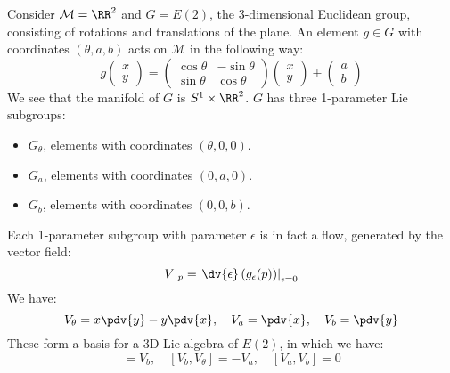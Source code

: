 \documentclass{jknotes}
\begin{document}
\begin{eg}
    Consider \(\mathcal{M}=\RR^2\) and \(G=E(2)\), the 3-dimensional Euclidean group, consisting of rotations and translations of the plane. An element \(g \in G\) with coordinates \((\theta,a,b)\) acts on \(\mathcal{M}\) in the following way:
    \begin{equation}
        g
        \begin{pmatrix}
            x \\ y
        \end{pmatrix}
        = 
        \begin{pmatrix}
            \cos\theta & -\sin\theta \\
            \sin\theta & \cos\theta
        \end{pmatrix}
        \begin{pmatrix}
            x \\ y
        \end{pmatrix}
        +
        \begin{pmatrix}
            a \\ b
        \end{pmatrix}
    \end{equation}
    We see that the manifold of \(G\) is \(S^1\times \RR^2\). \(G\) has three 1-parameter Lie subgroups:
    \begin{itemize}
        \item \(G_\theta\), elements with coordinates \((\theta,0,0)\). 
        \item \(G_a\), elements with coordinates \((0,a,0)\). 
        \item \(G_b\), elements with coordinates \((0,0,b)\). 
    \end{itemize}
    Each 1-parameter subgroup with parameter \(\epsilon\) is in fact a flow, generated by the vector field:
    \begin{equation}
        V|_p = \left.\dv{\epsilon}\left( g_\epsilon(p) \right)\right|_{\epsilon=0}
    \end{equation}
    We have:
    \begin{equation}
        V_\theta = x\pdv{y}-y\pdv{x},\quad
        V_a = \pdv{x},\quad
        V_b = \pdv{y}
    \end{equation}
    These form a basis for a 3D Lie algebra of \(E(2)\), in which we have:
    \begin{equation}
        [V_a,V_\theta] = V_b,\quad
        [V_b,V_\theta] = -V_a,\quad
        [V_a,V_b] = 0
    \end{equation}
\end{eg}
\end{document}
